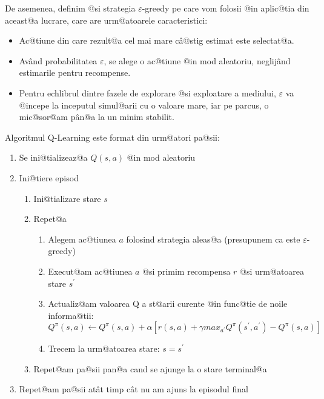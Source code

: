  De asemenea, definim @si strategia $\varepsilon$-greedy pe care vom folosii @in aplic@tia din aceast@a lucrare, care are urm@atoarele caracteristici:

\begin{itemize}
	\item Ac@tiune din care rezult@a cel mai mare c\^ a@stig estimat este selectat@a.
	\item Av\^ and probabilitatea $\varepsilon$, se alege o ac@tiune @in mod aleatoriu, neglij\^and estimarile pentru recompense.
	\item Pentru echlibrul dintre fazele de explorare @si exploatare a mediului, $\varepsilon$ va @incepe la inceputul simul@arii cu o valoare mare, iar pe parcus, o mic@sor@am p\^ an@a la un minim stabilit.
\end{itemize}

Algoritmul Q-Learning este format din urm@atori pa@sii:

\begin{enumerate}
	\item Se ini@tializeaz@a $Q(s, a)$ @in mod aleatoriu
	\item Ini@tiere episod
	\begin{enumerate}[1.]
		\item Ini@tializare stare $s$
		\item Repet@a
		\begin{enumerate}[1.]
			\item Alegem ac@tiunea $a$ folosind strategia aleas@a (presupunem ca este $\varepsilon$-greedy)
			\item Execut@am ac@tiunea $a$ @si primim recompensa $r$ @si urm@atoarea stare $s^{\prime}$
			\item Actualiz@am valoarea Q a st@arii curente @in func@tie de noile informa@tii: \begin{equation} \label{eq:q-formula}
			Q^{\pi}(s, a) \leftarrow Q^{\pi}(s, a) + \alpha \left[ r(s,a) + \gamma max_{a^{\prime}} Q^{\pi}(s^{\prime}, a^{\prime}) - Q^{\pi}(s, a) \right]
\end{equation}			
			\item Trecem la urm@atoarea stare: $s = s^{\prime}$
		\end{enumerate}
		\item Repet@am pa@sii pan@a cand se ajunge la o stare terminal@a
	\end{enumerate}	
	\item Repet@am pa@sii at\^at timp c\^ at nu am ajuns la episodul final	
\end{enumerate}

